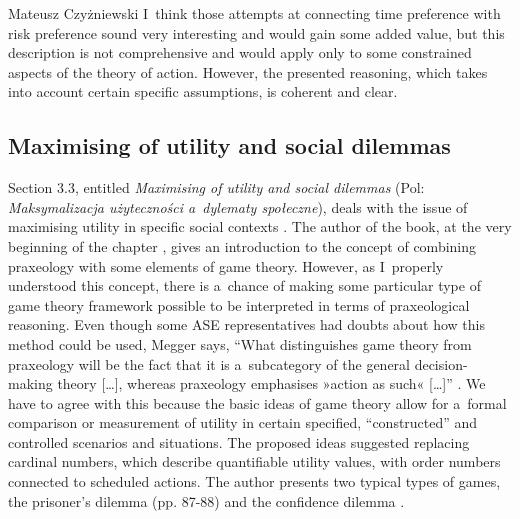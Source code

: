 \begin{newrevengenv}{Mateusz Czyżniewski}
I~think those attempts at connecting time preference with risk preference sound very interesting and would gain some added value, but this description is not comprehensive and would apply only to some constrained aspects of the theory of action. However, the presented reasoning, which takes into account certain specific assumptions, is coherent and clear.



\subsection{Maximising of utility and social dilemmas}



Section 3.3, entitled \textit{Maximising of utility and social dilemmas} (Pol: \textit{Maksymalizacja użyteczności a~dylematy społeczne}), deals with the issue of maximising utility in specific social contexts 
\parencite[][pp.82–94]{megger_sprawiedliwosc_2021}. %
 The author of the book, at the very beginning of the chapter 
\parencite[][pp.83–86]{megger_sprawiedliwosc_2021}, %
 gives an introduction to the concept of combining praxeology with some elements of game theory. However, as I~properly understood this concept, there is a~chance of making some particular type of game theory framework possible to be interpreted in terms of praxeological reasoning. Even though some ASE representatives had doubts about how this method could be used, Megger says, ``What distinguishes game theory from praxeology will be the fact that it is a~subcategory of the general decision-making theory […], whereas praxeology emphasises »action as such« […]'' 
\parencite[][p.85]{megger_sprawiedliwosc_2021}. %
 We have to agree with this because the basic ideas of game theory allow for a~formal comparison or measurement of utility in certain specified, ``constructed'' and controlled scenarios and situations. The proposed ideas suggested replacing cardinal numbers, which describe quantifiable utility values, with order numbers connected to scheduled actions. The author presents two typical types of games, the prisoner's dilemma (pp. 87-88) and the confidence dilemma 
\parencite[][pp.89–91]{megger_sprawiedliwosc_2021}.%





\end{newrevengenv}
